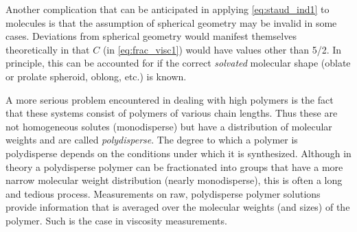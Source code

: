 Another complication that can be anticipated in applying \cref{eq:staud_ind1} to molecules is that the assumption of spherical geometry may be invalid in some cases. 
Deviations from spherical geometry would manifest themselves theoretically in that \( C \) (in \cref{eq:frac_visc1}) would have values other than \num[parse-numbers=false]{5/2}. 
In principle, this can be accounted for if the correct \emph{solvated} molecular shape (oblate or prolate spheroid, oblong, etc.) is known.

A more serious problem encountered in dealing with high polymers is the fact that these systems consist of polymers of various chain lengths. 
Thus these are not homogeneous solutes (monodisperse) but have a distribution of molecular weights and are called \emph{polydisperse}. 
The degree to which a polymer is polydisperse depends on the conditions under which it is synthesized. 
Although in theory a polydisperse polymer can be fractionated into groups that have a more narrow molecular weight distribution (nearly monodisperse), this is often a long and tedious process. 
Measurements on raw, polydisperse polymer solutions provide information that is averaged over the molecular weights (and sizes) of the polymer. 
Such is the case in viscosity measurements.

